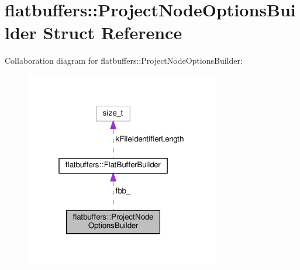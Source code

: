 \hypertarget{structflatbuffers_1_1ProjectNodeOptionsBuilder}{}\section{flatbuffers\+:\+:Project\+Node\+Options\+Builder Struct Reference}
\label{structflatbuffers_1_1ProjectNodeOptionsBuilder}


Collaboration diagram for flatbuffers\+:\+:Project\+Node\+Options\+Builder\+:
\nopagebreak
\begin{figure}[H]
\begin{center}
\leavevmode
\includegraphics[width=241pt]{structflatbuffers_1_1ProjectNodeOptionsBuilder__coll__graph}
\end{center}
\end{figure}
